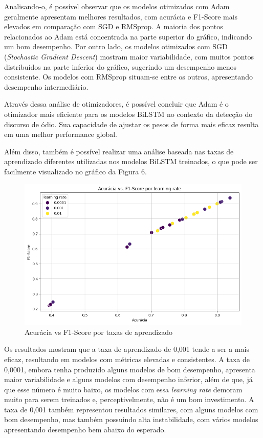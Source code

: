 \documentclass[conference]{IEEEtran}
\begin{document}
Analisando-o, é possível observar que os modelos otimizados com Adam geralmente apresentam melhores resultados, com acurácia e F1-Score mais elevados em comparação com SGD e RMSprop. A maioria dos pontos relacionados ao Adam está concentrada na parte superior do gráfico, indicando um bom desempenho. Por outro lado, os modelos otimizados com SGD (\textit{Stochastic Gradient Descent}) mostram maior variabilidade, com muitos pontos distribuídos na parte inferior do gráfico, sugerindo um desempenho menos consistente. Os modelos com RMSprop situam-se entre os outros, apresentando desempenho intermediário.

Através dessa análise de otimizadores, é possível concluir que Adam é o otimizador mais eficiente para os modelos BiLSTM no contexto da detecção do discurso de ódio. Sua capacidade de ajustar os pesos de forma mais eficaz resulta em uma melhor performance global.

Além disso, também é possível realizar uma análise baseada nas taxas de aprendizado diferentes utilizadas nos modelos BiLSTM treinados, o que pode ser facilmente visualizado no gráfico da Figura 6.

\begin{figure}[h!]
    \centering
    \includegraphics[width=\linewidth]{bilstm-lr.png}
    \caption{Acurácia vs F1-Score por taxas de aprendizado}
    \label{fig:exemplo5}
\end{figure}

Os resultados mostram que a taxa de aprendizado de 0,001 tende a ser a mais eficaz, resultando em modelos com métricas elevadas e consistentes. A taxa de 0,0001, embora tenha produzido alguns modelos de bom desempenho, apresenta maior variabilidade e alguns modelos com desempenho inferior, além de que, já que esse número é muito baixo, os modelos com essa \textit{learning rate} demoram muito para serem treinados e, perceptivelmente, não é um bom investimento. A taxa de 0,001 também representou resultados similares, com alguns modelos com bom desempenho, mas também possuindo alta instabilidade, com vários modelos apresentando desempenho bem abaixo do esperado.
\end{document}
